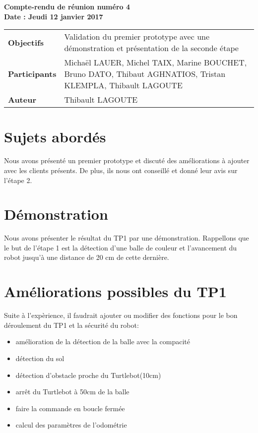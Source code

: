 \documentclass[a4wide,10pt]{article}
\begin{document}
\thispagestyle{empty}

\begin{center}
\LARGE \bfseries  Compte-rendu de réunion numéro 4 \\
\large \bfseries  Date : Jeudi 12 janvier 2017

\vspace{0.33cm}
\end{center}

\begin{center}
\begin{tabular}{ p{2.2cm}  p{13.6cm} }
\textbf{Objectifs} & Validation du premier prototype avec une démonstration et présentation de la seconde étape  \\
\textbf{Participants} & Michaël LAUER, Michel TAIX, Marine BOUCHET, Bruno DATO, Thibaut AGHNATIOS, Tristan KLEMPLA, Thibault LAGOUTE \\ 
\textbf{Auteur} & Thibault LAGOUTE \\
\end{tabular}
\end{center}

\section*{Sujets abordés}

Nous avons présenté un premier prototype et discuté des améliorations à ajouter avec les clients présents. De plus, ils nous ont conseillé et donné leur avis sur l'étape 2.


\section*{Démonstration}


Nous avons présenter le résultat du TP1 par une démonstration. Rappellons que le but de l'étape 1 est la détection d'une balle de couleur et l'avancement du robot jusqu'à une distance de 20 cm de cette dernière. \\  
	

\section*{Améliorations possibles du TP1}

Suite à l'expèrience, il faudrait ajouter ou modifier des fonctions pour le bon déroulement du TP1 et la sécurité du robot:

\begin{itemize}
\item amélioration de la détection de la balle avec la compacité
\item détection du sol
\item détection d'obstacle proche du Turtlebot(10cm)
\item arrêt du Turtlebot à 50cm de la balle
\item faire la commande en boucle fermée 
\item calcul des paramètres de l'odométrie
\end{itemize}
\end{document}
